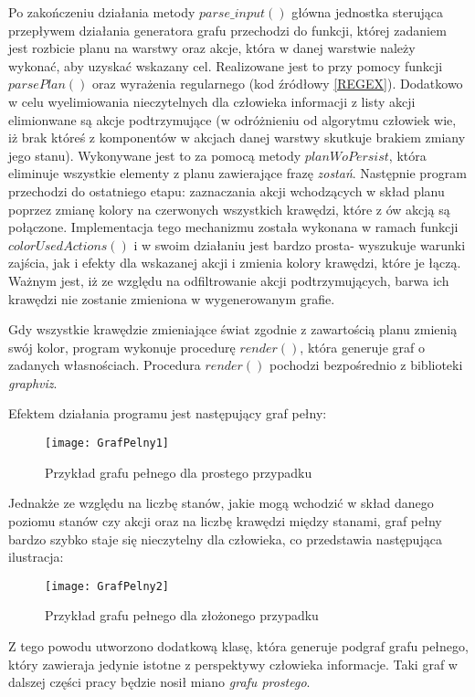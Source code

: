     Po zakończeniu działania metody $parse\_input()$ główna jednostka sterująca przepływem działania generatora grafu przechodzi do funkcji, której 
    zadaniem jest rozbicie planu na warstwy oraz akcje, która w danej warstwie należy wykonać, aby uzyskać wskazany cel. Realizowane jest to przy 
    pomocy funkcji $parsePlan()$ oraz wyrażenia regularnego (kod źródłowy \ref{REGEX}). Dodatkowo w celu wyelimiowania nieczytelnych dla człowieka informacji z 
    listy akcji elimionwane są akcje podtrzymujące (w odróżnieniu od algorytmu człowiek wie, iż brak któreś z komponentów w 
    akcjach danej warstwy skutkuje brakiem zmiany jego stanu). Wykonywane jest to za pomocą metody $planWoPersist$, która eliminuje wszystkie 
    elementy z planu zawierające frazę \textit{zostań}. 
    Następnie program przechodzi do ostatniego etapu: zaznaczania akcji wchodzących w skład planu poprzez zmianę kolory na czerwonych wszystkich 
    krawędzi, które z ów akcją są połączone. Implementacja tego mechanizmu została wykonana w ramach funkcji $colorUsedActions()$ i w swoim działaniu 
    jest bardzo prosta- wyszukuje warunki zajścia, jak i efekty dla wskazanej akcji i zmienia kolory krawędzi, które je łączą. Ważnym jest, iż ze 
    względu na odfiltrowanie akcji podtrzymujących, barwa ich krawędzi nie zostanie zmieniona w wygenerowanym grafie. 

    Gdy wszystkie krawędzie zmieniające świat zgodnie z zawartością planu zmienią swój kolor, program wykonuje procedurę $render()$, która 
    generuje graf o zadanych własnościach. Procedura $render()$ pochodzi bezpośrednio z biblioteki \textit{graphviz}.

    Efektem działania programu jest następujący graf pełny:

    \begin{figure}[H]
        \texttt{[image: GrafPelny1]}
        \centering
        \caption{Przykład grafu pełnego dla prostego przypadku}
    \end{figure}
    Jednakże ze względu na liczbę stanów, jakie mogą wchodzić w skład danego poziomu stanów czy akcji oraz na liczbę krawędzi między stanami, graf 
    pełny bardzo szybko staje się nieczytelny dla człowieka, co przedstawia następująca ilustracja:
    \begin{figure}[H]
        \texttt{[image: GrafPelny2]}
        \centering
        \caption{Przykład grafu pełnego dla złożonego przypadku}
    \end{figure}
    Z tego powodu utworzono dodatkową klasę, która generuje podgraf grafu pełnego, który zawieraja jedynie istotne z perspektywy człowieka informacje.
    Taki graf w dalszej części pracy będzie nosił miano \textit{grafu prostego}.

